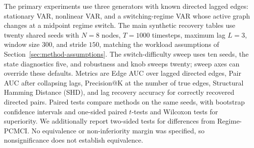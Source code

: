 \documentclass[sigconf,anonymous]{acmart}
\begin{document}
The primary experiments use three generators with known directed lagged edges: stationary VAR, nonlinear VAR, and a switching-regime VAR whose active graph changes at a midpoint regime switch.
The main synthetic recovery tables use twenty shared seeds with $N{=}8$ nodes, $T{=}1000$ timesteps, maximum lag $L{=}3$, window size $300$, and stride $150$, matching the workload assumptions of Section~\ref{sec:method-assumptions}. The switch-difficulty sweep uses ten seeds, the state diagnostics five, and robustness and knob sweeps twenty; sweep axes can override these defaults.
Metrics are Edge AUC over lagged directed edges, Pair AUC after collapsing lags, Precision@K at the number of true edges, Structural Hamming Distance (SHD), and lag recovery accuracy for correctly recovered directed pairs.
Paired tests compare methods on the same seeds, with bootstrap confidence intervals and one-sided paired $t$-tests and Wilcoxon tests for superiority. We additionally report two-sided tests for differences from Regime-PCMCI. No equivalence or non-inferiority margin was specified, so nonsignificance does not establish equivalence.
\end{document}
